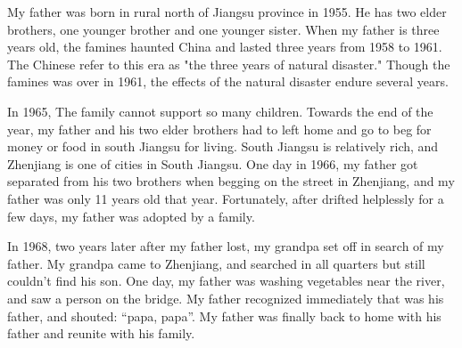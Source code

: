 \documentclass[12pt,a4paper]{caspset}
\begin{document}

My father was born in rural north of Jiangsu province in 1955. He has two elder brothers, one younger brother  and one younger sister.  When my father is three years old, the famines haunted China and lasted three years from 1958 to 1961. The Chinese refer to this era as "the three years of natural disaster." Though the famines was over in 1961, the effects of the natural disaster endure several years. 

In 1965, The family cannot support so many children. Towards the end of the year, my father and his two elder brothers had to left home and go to beg for money or food in south Jiangsu for living. South Jiangsu is relatively rich, and Zhenjiang is one of cities in  South Jiangsu. One day in 1966, my father got separated from his two brothers when begging on the street in Zhenjiang, and my father was only 11 years old that year. Fortunately, after drifted helplessly for a few days, my father was adopted by a family. 

In 1968, two years later after my father lost, my grandpa set off in search of my father.  My grandpa came to Zhenjiang, and searched in all quarters but still couldn't find his son. One day, my father was washing vegetables near the river, and saw a person on the bridge. My father recognized immediately that was his father, and shouted: “papa, papa”.  My father was finally back to home with his father and reunite with his family.
\end{document}
